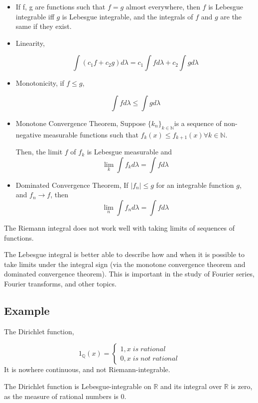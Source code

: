 \documentclass{article}
\begin{document}
\begin{itemize}
    \item     If f, g are functions such that $f = g$ almost everywhere, then $f$ is Lebesgue integrable iff $g$ is Lebesgue integrable, and the integrals of $f$ and $g$ are the same if they exist.
    \item Linearity,
    
    $$\int (c_1f+c_2g )d\lambda= c_1 \int f d\lambda+ c_2 \int g d\lambda$$
    \item Monotonicity, if $f\leq g$,
    
    $$\int f d\lambda \leq \int g d\lambda$$
    \item Monotone Convergence Theorem, Suppose $\{ k_n\}_{k \in \mathbb{N}} $is a sequence of non-negative measurable functions such that
    $f_{k}(x) \leq f_{k+1}(x) \forall k \in \mathbb{N}.$
    
    Then, the limit $f$ of $f_k$ is Lebesgue measurable and
    \[ \lim_{k} \int f_k d\lambda = \int f d\lambda\]
    
    \item Dominated Convergence Theorem,  If $|f_n| \leq g$ for an integrable function $g$, and $f_n \to f$, then
    $$ \lim_{n}\int f_n d\lambda =\int f d\lambda$$
\end{itemize}
The Riemann integral does not work well with taking limits of sequences of functions. 

The Lebesgue integral is better able to describe how and when it is possible to take limits under the integral sign (via the monotone convergence theorem and dominated convergence theorem). This is important in the study of Fourier series, Fourier transforms, and other topics. 


\subsection{Example}
The Dirichlet function,

\[ 1_{\mathbb{Q}}(x)=\begin{cases} 
    1 , x \;is\; rational \\
    0 , x \;is\; not\; rational
   \end{cases}
\]
 It is nowhere continuous, and not Riemann-integrable.\medskip
 
 The Dirichlet function is Lebesgue-integrable on $\mathbb{R}$ and its integral over $\mathbb{R}$ is zero, as the measure of rational numbers is 0.
\end{document}
